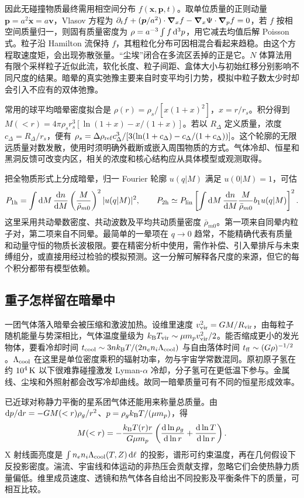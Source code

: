 因此无碰撞物质最终需用相空间分布 $f(\bm x,\bm p,t)$。取单位质量的正则动量 $\bm p=a^2\dot{\bm x}=a\bm v$，Vlasov 方程为 $\partial_t f+(\bm p/a^2)\cdot\bm\nabla_x f-\bm\nabla_x\Psi\cdot\bm\nabla_p f=0$，若 $f$ 按相空间质量归一，则固有质量密度为 $\rho=a^{-3}\int f\,\dd^3p$，用它减去均值后解 Poisson 式。粒子沿 Hamilton 流保持 $f$，其粗粒化分布可因相混合看起来趋稳。由这个方程取速度矩，会出现弥散张量。“尘埃”闭合在多流区丢掉的正是它。$N$ 体算法用有限个采样粒子近似此流，软化长度、粒子间距、盒体大小与初始红移分别影响不同尺度的结果。暗晕的真实弛豫主要来自时变平均引力势，模拟中粒子数太少时却会引入不应有的双体弛豫。

常用的球平均暗晕密度拟合是 $\rho(r)=\rho_s/[x(1+x)^2]$，$x=r/r_s$。积分得到 $M(<r)=4\pi\rho_s r_s^3[\ln(1+x)-x/(1+x)]$。若以 $R_\Delta$ 定义质量，浓度 $c_\Delta=R_\Delta/r_s$，便有 $\rho_s=\Delta\rho_{\rm ref}c_\Delta^3/[3(\ln(1+c_\Delta)-c_\Delta/(1+c_\Delta))]$。这个轮廓的无限远质量对数发散，使用时须明确外截断或嵌入周围物质的方式。气体冷却、恒星和黑洞反馈可改变内区，相关的浓度和核心结构应从具体模型或观测取得。

把全物质形式上分成暗晕，归一 Fourier 轮廓 $u(q|M)$ 满足 $u(0|M)=1$，可估
\[
 P_{\rm 1h}=\int\dd M\,\frac{\dd n}{\dd M}
        \left(\frac{M}{\bar\rho_{m0}}\right)^2|u(q|M)|^2,\qquad
 P_{\rm 2h}\simeq P_{\rm lin}
   \left[\int\dd M\,\frac{\dd n}{\dd M}\frac{M}{\bar\rho_{m0}}b_1u(q|M)\right]^2.
\]
这里采用共动晕数密度、共动波数及平均共动质量密度 $\bar\rho_{m0}$。第一项来自同晕内粒子对，第二项来自不同晕。最简单的一晕项在 $q\to0$ 趋常，不能精确代表有质量和动量守恒的物质长波极限。要在精密分析中使用，需作补偿、引入晕排斥与未束缚组分，或直接用经过检验的模拟预测。这一分解可解释各尺度的来源，但它的每个积分都带有模型依赖。

\subsection{重子怎样留在暗晕中}

一团气体落入暗晕会被压缩和激波加热。设维里速度 $v_{\rm vir}^2=GM/R_{\rm vir}$，由每粒子随机能量与势深相比，气体温度量级为 $k_{\rm B}T_{\rm vir}\sim\mu m_pv_{\rm vir}^2/2$。能否缩成更小的发光物体，要看冷却时间 $t_{\rm cool}\sim3nk_{\rm B}T/(2n_en_i\Lambda_{\rm cool})$ 与自由落体时间 $t_{\rm ff}\sim(G\rho)^{-1/2}$。$\Lambda_{\rm cool}$ 在这里是单位密度乘积的辐射功率，勿与宇宙学常数混同。原初原子氢在约 $10^4\,{\rm K}$ 以下很难靠碰撞激发 Lyman-$\alpha$ 冷却，分子氢可在更低温下参与。金属线、尘埃和外照射都会改写冷却曲线。故同一暗晕质量可有不同的恒星形成效率。

已近球对称静力平衡的星系团气体还能用来称量总质量。由 $\dd p/\dd r=-GM(<r)\rho_g/r^2$、$p=\rho_g k_{\rm B}T/(\mu m_p)$，得
\[
 M(<r)=-\frac{k_{\rm B}T(r)r}{G\mu m_p}
          \left(\frac{\dd\ln\rho_g}{\dd\ln r}+\frac{\dd\ln T}{\dd\ln r}\right).
\]
X 射线面亮度是 $\int n_en_i\Lambda_{\rm cool}(T,Z)\,\dd\ell$ 的投影，谱形可约束温度，再在几何假设下反投影密度。湍流、宇宙线和体运动的非热压会贡献支撑，忽略它们会使热静力质量偏低。维里成员速度、透镜和热气体各自给出不同投影及平衡条件下的质量，可相互比较。

